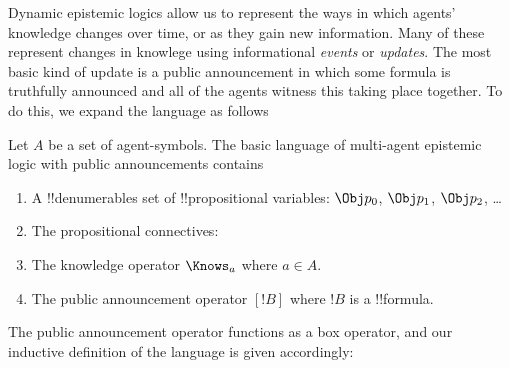 \documentclass[../../../include/open-logic-section]{subfiles}
\begin{document}


Dynamic epistemic logics allow us to represent the ways in which agents' knowledge changes over time,
or as they gain new information. Many of these represent changes in knowlege using informational
\emph{events} or \emph{updates}. The most basic kind of update is a public announcement in which some
formula is truthfully announced and all of the agents witness this taking place together. To do this,
we expand the language as follows

\begin{defn}
Let $A$ be a set of agent-symbols. The basic language of multi-agent epistemic logic with 
public announcements contains
\begin{enumerate}
  \item A !!{denumerable}s set of !!{propositional variable}s: $\Obj
    p_0$, $\Obj p_1$, $\Obj p_2$, \dots
  \item The propositional connectives: \startycommalist
  \item The knowledge operator $\Knows_a$ where $a \in A$.
  \item The public announcement operator $[!B]$ where $!B$ is a !!{formula}.
\end{enumerate}
\end{defn}

The public announcement operator functions as a box operator, and our inductive definition of the language is given accordingly:
\end{document}
